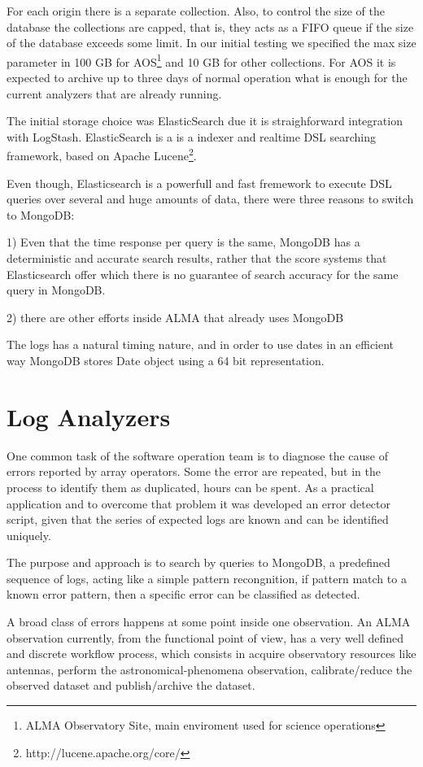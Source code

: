 \documentclass[]{spie}  %
\begin{document}
For each origin there is a separate collection. Also, to control the size of
the database the collections are capped, that is, they acts as a FIFO queue if
the size of the database exceeds some limit. In our initial testing we
specified the max size parameter in 100 GB for AOS\footnote{ALMA Observatory Site, 
main enviroment used for science operations} and 10 GB for other
collections. For AOS it is expected to archive up to three days of normal operation
what is enough for the current analyzers that are already running.

The initial storage choice was ElasticSearch due it is straighforward
integration with LogStash. ElasticSearch is a is a indexer and realtime DSL searching framework, based on Apache Lucene\footnote{http://lucene.apache.org/core/}.

Even though, Elasticsearch is a powerfull and fast fremework to execute DSL queries
over several and huge amounts of data, there were three reasons to switch to MongoDB:

1) Even that the time response per query is the same, MongoDB has a deterministic and accurate search results, rather that the score systems that Elasticsearch offer which there is no guarantee of search accuracy for the same query in MongoDB.

2) there are other efforts inside ALMA that already uses MongoDB\cite{shenexploring}

The logs has a natural timing nature, and in order to use dates in an efficient
way MongoDB stores Date object using a 64 bit representation.

\section{Log Analyzers}
One common task of the software operation team is to diagnose the cause of errors
reported by array operators. Some the error are repeated, but in the
process to identify them as duplicated, hours can be spent. As a practical
application and to overcome that problem it was developed an error detector
script, given that the series of expected logs are known and can be identified uniquely. 

The purpose and approach is to search by queries to MongoDB, a predefined sequence of 
logs, acting like a simple pattern recongnition, if pattern match to a known error
pattern, then a specific error can be classified as detected.

A broad class of errors happens at some point inside one observation. An ALMA observation currently, from the functional point of view, has a very well defined and discrete workflow process, which consists in acquire observatory resources like antennas, 
perform the astronomical-phenomena observation, calibrate/reduce the
observed dataset and publish/archive the dataset. 
\end{document}
